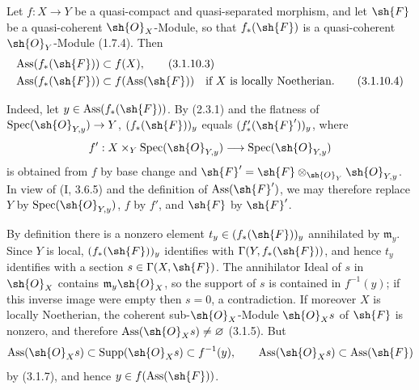 \begin{remark}[3.1.10.2]
Let $f:X\to Y$ be a quasi-compact and quasi-separated morphism, and let
$\sh{F}$ be a quasi-coherent $\sh{O}_X$-Module, so that $f_*(\sh{F})$
is a quasi-coherent $\sh{O}_Y$-Module (1.7.4).  Then
\begin{align}
 \operatorname{Ass}(f_*(\sh{F}))&\subset f(X), \tag{3.1.10.3}\\
 \operatorname{Ass}(f_*(\sh{F}))&\subset f(\operatorname{Ass}(\sh{F}))
       \quad\text{if $X$ is locally Noetherian}. \tag{3.1.10.4}
\end{align}

Indeed, let $y\in\operatorname{Ass}(f_*(\sh{F}))$.  By (2.3.1) and the
flatness of $\operatorname{Spec}(\sh{O}_{Y,y})\to Y$,
$(f_*(\sh{F}))_y$ equals $(f'_*(\sh{F}'))_y$, where
\[
 f':X\times_Y\operatorname{Spec}(\sh{O}_{Y,y})
       \longrightarrow\operatorname{Spec}(\sh{O}_{Y,y})
\]
is obtained from $f$ by base change and
$\sh{F}'=\sh{F}\otimes_{\sh{O}_Y}\sh{O}_{Y,y}$.  In view of (I, 3.6.5)
and the definition of $\operatorname{Ass}(\sh{F}')$, we may therefore
replace $Y$ by $\operatorname{Spec}(\sh{O}_{Y,y})$, $f$ by $f'$, and
$\sh{F}$ by $\sh{F}'$.

By definition there is a nonzero element
$t_y\in(f_*(\sh{F}))_y$ annihilated by $\mathfrak m_y$.  Since $Y$ is
local, $(f_*(\sh{F}))_y$ identifies with
$\Gamma(Y,f_*(\sh{F}))$, and hence $t_y$ identifies with a section
$s\in\Gamma(X,\sh{F})$.  The annihilator Ideal of $s$ in $\sh{O}_X$
contains $\mathfrak m_y\sh{O}_X$, so the support of $s$ is contained in
$f^{-1}(y)$; if this inverse image were empty then $s=0$, a
contradiction.  If moreover $X$ is locally Noetherian, the coherent
sub-$\sh{O}_X$-Module $\sh{O}_Xs$ of $\sh{F}$ is nonzero, and therefore
$\operatorname{Ass}(\sh{O}_Xs)\neq\varnothing$ (3.1.5).  But
\[
 \operatorname{Ass}(\sh{O}_Xs)\subset\operatorname{Supp}(\sh{O}_Xs)
 \subset f^{-1}(y),
 \qquad
 \operatorname{Ass}(\sh{O}_Xs)\subset\operatorname{Ass}(\sh{F})
\]
by (3.1.7), and hence $y\in f(\operatorname{Ass}(\sh{F}))$.
\end{remark}

